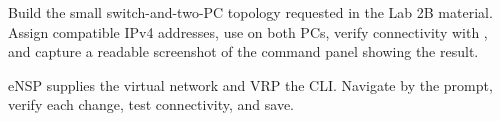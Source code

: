 \begin{tryit}
Build the small switch-and-two-PC topology requested in the Lab 2B material. Assign compatible IPv4 addresses, use  on both PCs, verify connectivity with , and capture a readable screenshot of the command panel showing the result.
\end{tryit}

\begin{chapterrecap}
eNSP supplies the virtual network and VRP the CLI. Navigate by the prompt, verify each change, test connectivity, and save.
\end{chapterrecap}


